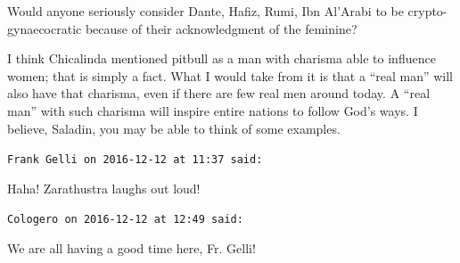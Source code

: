 \begin{footnotesize}
\begin{sffamily}
Would anyone seriously consider Dante, Hafiz, Rumi, Ibn Al'Arabi to be crypto-gynaecocratic because of their acknowledgment of the feminine?

I think Chicalinda mentioned pitbull as a man with charisma able to influence women; that is simply a fact. What I would take from it is that a ``real man'' will also have that charisma, even if there are few real men around today. A ``real man'' with such charisma will inspire entire nations to follow God's ways. I believe, Saladin, you may be able to think of some examples.

\hfill

\texttt{Frank Gelli on 2016-12-12 at 11:37 said:}

Haha! Zarathustra laughs out loud!

\hfill

\texttt{Cologero on 2016-12-12 at 12:49 said:}

We are all having a good time here, Fr. Gelli!

\hfill

\end{sffamily}
\end{footnotesize}

